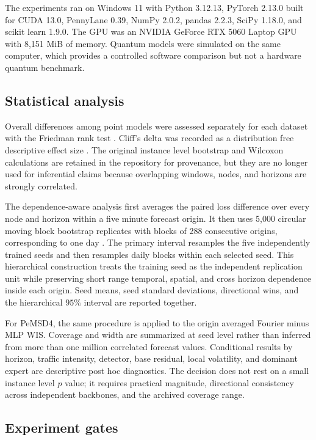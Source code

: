\documentclass[pdflatex,sn-mathphys-num]{sn-jnl}
\begin{document}
The experiments ran on Windows 11 with Python 3.12.13, PyTorch 2.13.0 built for CUDA 13.0, PennyLane 0.39, NumPy 2.0.2, pandas 2.2.3, SciPy 1.18.0, and scikit learn 1.9.0. The GPU was an NVIDIA GeForce RTX 5060 Laptop GPU with 8,151 MiB of memory. Quantum models were simulated on the same computer, which provides a controlled software comparison but not a hardware quantum benchmark.

\subsection{Statistical analysis}\label{subsec:statistics}

Overall differences among point models were assessed separately for each dataset with the Friedman rank test \cite{friedman1937ranks}. Cliff's delta was recorded as a distribution free descriptive effect size \cite{cliff1993dominance}. The original instance level bootstrap and Wilcoxon calculations are retained in the repository for provenance, but they are no longer used for inferential claims because overlapping windows, nodes, and horizons are strongly correlated.

The dependence-aware analysis first averages the paired loss difference over every node and horizon within a five minute forecast origin. It then uses 5,000 circular moving block bootstrap replicates with blocks of 288 consecutive origins, corresponding to one day \cite{efron1979bootstrap}. The primary interval resamples the five independently trained seeds and then resamples daily blocks within each selected seed. This hierarchical construction treats the training seed as the independent replication unit while preserving short range temporal, spatial, and cross horizon dependence inside each origin. Seed means, seed standard deviations, directional wins, and the hierarchical $95\%$ interval are reported together.

For PeMSD4, the same procedure is applied to the origin averaged Fourier minus MLP WIS. Coverage and width are summarized at seed level rather than inferred from more than one million correlated forecast values. Conditional results by horizon, traffic intensity, detector, base residual, local volatility, and dominant expert are descriptive post hoc diagnostics. The decision does not rest on a small instance level $p$ value; it requires practical magnitude, directional consistency across independent backbones, and the archived coverage range.

\subsection{Experiment gates}\label{subsec:gates}
\end{document}
